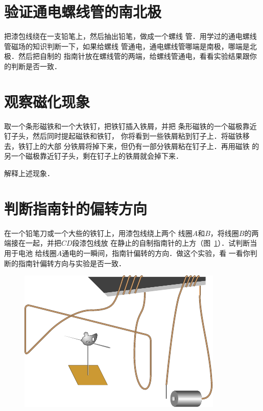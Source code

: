     \section{验证通电螺线管的南北极}
把漆包线绕在一支铅笔上，然后抽出铅笔，做成一个螺线
管．用学过的通电螺线管磁场的知识判断一下，如果给螺线
管通电，通电螺线管哪端是南极，哪端是北极．然后把自制的
指南针放在螺线管的两端，给螺线管通电，看看实验结果跟你
的判断是否一致．

\section{观察磁化现象}
取一个条形磁铁和一个大铁钉，把铁钉插入铁屑，并把
条形磁铁的一个磁极靠近钉子头，然后同时提起磁铁和铁钉，
你将看到一些铁屑粘到钉子上．将磁铁移去，铁钉上的大部
分铁屑将掉下来，但仍有一部分铁屑粘在钉子上．再用磁铁
的另一个磁极靠近钉子头，剩在钉子上的铁屑就会掉下来．

解释上述现象．

\section{判断指南针的偏转方向}
在一个铅笔刀或一个大些的铁钉上，用漆包线绕上两个
线圈$A$和$B$，将线圈$B$的两端接在一起，并把$CD$段漆包线放
在静止的自制指南针的上方（图~\ref{fig_C_10-12}）．试判断当用于电池
给线圈$A$通电的一瞬间，指南针偏转的方向．做这个实验，看
一看你判断的指南针偏转方向与实验是否一致．
\begin{figure}[htbp]
    \centering
    \includegraphics{fig/C/10-12.pdf}
    \caption{}\label{fig_C_10-12}
\end{figure}

